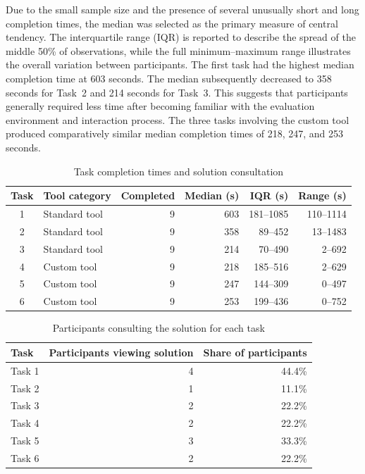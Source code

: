 Due to the small sample size and the presence of several unusually short and long completion times, the median was selected as the primary measure of central tendency. The interquartile range (IQR) is reported to describe the spread of the middle 50\% of observations, while the full minimum--maximum range illustrates the overall variation between participants. The first task had the highest median completion time at 603 seconds. The median subsequently decreased to 358 seconds for Task~2 and 214 seconds for Task~3. This suggests that participants generally required less time after becoming familiar with the evaluation environment and interaction process. The three tasks involving the custom tool produced comparatively similar median completion times of 218, 247, and 253 seconds. 

\FloatBarrier
\begin{table}[htbp]
  \centering
  \caption{Task completion times and solution consultation}
  \label{tab:user-study-task-interaction}
  \begin{tabular}{clrrrr}
      \hline
      \textbf{Task} &
      \textbf{Tool category} &
      \textbf{Completed} &
      \textbf{Median (s)} &
      \textbf{IQR (s)} &
      \textbf{Range (s)} \\
      \hline
      1 & Standard tool & 9 & 603 & 181--1085 & 110--1114 \\
      2 & Standard tool & 9 & 358 & 89--452   & 13--1483 \\
      3 & Standard tool & 9 & 214 & 70--490   & 2--692 \\
      4 & Custom tool   & 9 & 218 & 185--516  & 2--629 \\
      5 & Custom tool   & 9 & 247 & 144--309  & 0--497 \\
      6 & Custom tool   & 9 & 253 & 199--436  & 0--752 \\
      \hline
  \end{tabular}
\end{table}
\FloatBarrier

\FloatBarrier
\begin{table}[htbp]
  \centering
  \caption{Participants consulting the solution for each task}
  \label{tab:user-study-solution-views}
  \begin{tabular}{lrr}
      \hline
      \textbf{Task} &
      \textbf{Participants viewing solution} &
      \textbf{Share of participants} \\
      \hline
      Task 1 & 4 & 44.4\% \\
      Task 2 & 1 & 11.1\% \\
      Task 3 & 2 & 22.2\% \\
      Task 4 & 2 & 22.2\% \\
      Task 5 & 3 & 33.3\% \\
      Task 6 & 2 & 22.2\% \\
      \hline
  \end{tabular}
\end{table}
\FloatBarrier

